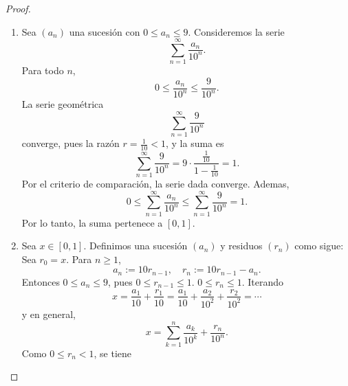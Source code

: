\documentclass[12pt,a4paper]{article}
\begin{document}
    \begin{proof}
        \begin{enumerate}
            \item[(a)]
            Sea $(a_{n})$ una sucesión con $0\leq a_{n}\leq 9$. Consideremos la serie
            \begin{equation*}
                \sum_{n=1}^{\infty}\frac{a_{n}}{10^{n}}.
            \end{equation*}
            Para todo $n$,
            \begin{equation*}
                0\leq\frac{a_{n}}{10^{n}}\leq\frac{9}{10^{n}}.
            \end{equation*}
            La serie geométrica
            \begin{equation*}
                \sum_{n=1}^{\infty}\frac{9}{10^{n}}
            \end{equation*}
            converge, pues la razón $r=\frac{1}{10}\lt1$, y la suma es
            \begin{equation*}
                \sum_{n=1}^{\infty}\frac{9}{10^{n}}=9\cdot\frac{\frac{1}{10}}{1-\frac{1}{10}}=1.
            \end{equation*}
            Por el criterio de comparación, la serie dada converge. Ademas,
            \begin{equation*}
                0\leq\sum_{n=1}^{\infty}\frac{a_{n}}{10^{n}}\leq\sum_{n=1}^{\infty}\frac{9}{10^{n}}=1.
            \end{equation*}
            Por lo tanto, la suma pertenece a $[0,1]$.
            \item[(b)]
            Sea $x\in[0,1]$. Definimos una sucesión $(a_{n})$ y residuos $(r_{n})$ como sigue: Sea $r_{0}=x$. Para $n\geq1$,
            \begin{equation*}
                a_{n}:=10r_{n-1},\quad r_{n}:=10r_{n-1}-a_{n}.
            \end{equation*}
            Entonces $0\leq a_{n}\leq9$, pues $0\leq r_{n-1}\leq1$. $0\leq r_{n}\leq1$. Iterando
            \begin{equation*}
                x=\frac{a_{1}}{10}+\frac{r_{1}}{10}=\frac{a_{1}}{10}+\frac{a_{2}}{10^{2}}+\frac{r_{2}}{10^{2}}=\cdots
            \end{equation*}
            y en general,
            \begin{equation*}
                x=\sum_{k=1}^{n}\frac{a_{k}}{10^{k}}+\frac{r_{n}}{10^{n}}.
            \end{equation*}
            Como $0\leq r_{n}\lt1$, se tiene

\end{enumerate}
\end{proof}
\end{document}
